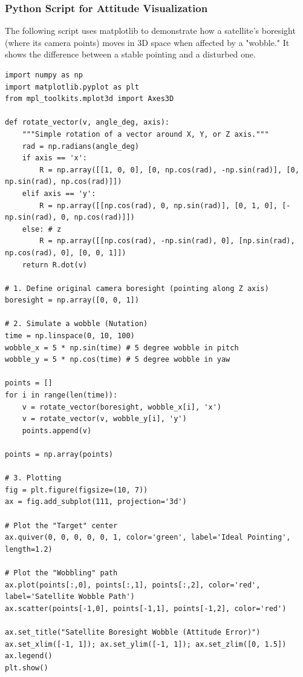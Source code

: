 \documentclass[a4paper,10pt]{article}
\begin{document}
\subsubsection{Python Script for Attitude Visualization}
The following script uses matplotlib to demonstrate how a satellite's boresight (where its camera points) moves in 3D space when affected by a "wobble." It shows the difference between a stable pointing and a disturbed one.
{
\scriptsize
\begin{verbatim}
import numpy as np
import matplotlib.pyplot as plt
from mpl_toolkits.mplot3d import Axes3D

def rotate_vector(v, angle_deg, axis):
    """Simple rotation of a vector around X, Y, or Z axis."""
    rad = np.radians(angle_deg)
    if axis == 'x':
        R = np.array([[1, 0, 0], [0, np.cos(rad), -np.sin(rad)], [0, np.sin(rad), np.cos(rad)]])
    elif axis == 'y':
        R = np.array([[np.cos(rad), 0, np.sin(rad)], [0, 1, 0], [-np.sin(rad), 0, np.cos(rad)]])
    else: # z
        R = np.array([[np.cos(rad), -np.sin(rad), 0], [np.sin(rad), np.cos(rad), 0], [0, 0, 1]])
    return R.dot(v)

# 1. Define original camera boresight (pointing along Z axis)
boresight = np.array([0, 0, 1])

# 2. Simulate a wobble (Nutation)
time = np.linspace(0, 10, 100)
wobble_x = 5 * np.sin(time) # 5 degree wobble in pitch
wobble_y = 5 * np.cos(time) # 5 degree wobble in yaw

points = []
for i in range(len(time)):
    v = rotate_vector(boresight, wobble_x[i], 'x')
    v = rotate_vector(v, wobble_y[i], 'y')
    points.append(v)

points = np.array(points)

# 3. Plotting
fig = plt.figure(figsize=(10, 7))
ax = fig.add_subplot(111, projection='3d')

# Plot the "Target" center
ax.quiver(0, 0, 0, 0, 0, 1, color='green', label='Ideal Pointing', length=1.2)

# Plot the "Wobbling" path
ax.plot(points[:,0], points[:,1], points[:,2], color='red', label='Satellite Wobble Path')
ax.scatter(points[-1,0], points[-1,1], points[-1,2], color='red')

ax.set_title("Satellite Boresight Wobble (Attitude Error)")
ax.set_xlim([-1, 1]); ax.set_ylim([-1, 1]); ax.set_zlim([0, 1.5])
ax.legend()
plt.show()
\end{verbatim}
}
\end{document}
